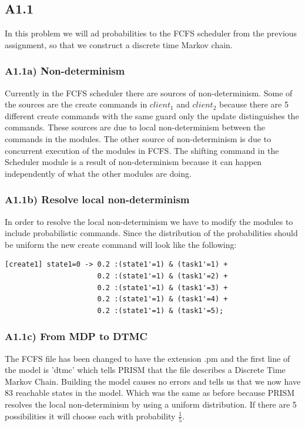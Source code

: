 \documentclass[12pt]{report}
\begin{document}
\subsection*{A1.1}
In this problem we will ad probabilities to the FCFS scheduler from the previous assignment, so that we construct a discrete time Markov chain.

\subsubsection*{A1.1a) Non-determinism}
Currently in the FCFS scheduler there are sources of non-determinism. Some of the sources are the create commands in $client_1$ and $client_2$ because there are 5 different create commands with the same guard only the update distinguishes the commands. These sources are due to local non-determinism between the commands in the modules. The other source of non-determinism is due to concurrent execution of the modules in FCFS. The shifting command in the Scheduler module is a result of non-determinism because it can happen independently of what the other modules are doing.

\subsubsection*{A1.1b) Resolve local non-determinism}
In order to resolve the local non-determinism we have to modify the modules to include probabilistic commands. Since the distribution of the probabilities should be uniform the new create command will look like the following:
\begin{lstlisting}[style=prismmodel]
[create1] state1=0 -> 0.2 :(state1'=1) & (task1'=1) +
                      0.2 :(state1'=1) & (task1'=2) +
                      0.2 :(state1'=1) & (task1'=3) +
                      0.2 :(state1'=1) & (task1'=4) + 
                      0.2 :(state1'=1) & (task1'=5);
\end{lstlisting}

\subsubsection*{A1.1c) From MDP to DTMC}
The FCFS file has been changed to have the extension .pm and the first line of the model is 'dtmc' which tells PRISM that the file describes a Discrete Time Markov Chain. Building the model causes no errors and tells us that we now have 83 reachable states in the model. Which was the same as before because PRISM resolves the local non-determinism by using a uniform distribution. If there are 5 possibilities it will choose each with probability $\frac{1}{5}$.
\end{document}
